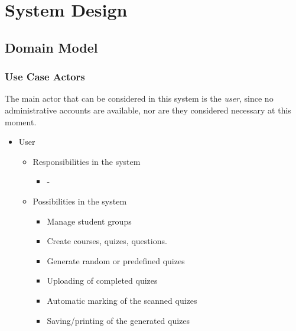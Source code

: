 \section{System Design}


\subsection{Domain Model}

\subsubsection{Use Case Actors}
The main actor that can be considered in this system is the \textit{user}, since no administrative accounts are available, nor are they considered necessary at this moment.
\begin{itemize}
  \item User
  \begin{itemize}
    \item Responsibilities in the system
    \begin{itemize}
      \item -
    \end{itemize}
    \item Possibilities in the system
    \begin{itemize}
      \item Manage student groups 
      \item Create courses, quizes, questions.
      \item Generate random or predefined quizes
      \item Uploading of completed quizes
      \item Automatic marking of the scanned quizes
      \item Saving/printing of the generated quizes
    \end{itemize}
  \end{itemize}
\end{itemize}


